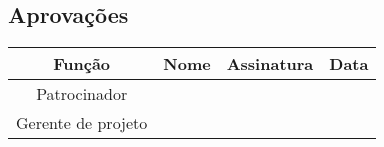 \begin{landscape}
	\section{Aprovações}

	\begin{table}[H]
		\begin{tabularx}{\textwidth}{| c | c | X | c |}
			\hline
			\textbf{Função}  & \textbf{Nome}         & \textbf{Assinatura}        & \textbf{Data} \\
			\hline
			Patrocinador       & \projectSponsorName{} & \projectSponsorSignature{} &               \\
			\hline
			Gerente de projeto & \projectManagerName{} & \projectManagerSignature{} &               \\
			\hline
		\end{tabularx}
		\centering
	\end{table}

\end{landscape}